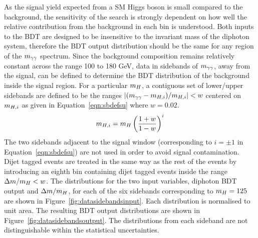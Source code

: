 As the signal yield expected from a SM Higgs boson is small compared to the background, 
the sensitivity of the search is strongly dependent on how well the relative contribution
from the background in each bin is understood.
Both inputs to the BDT are designed to be insensitive to the invariant mass of the diphoton system,
therefore the BDT output distribution should be the same for any region of the $m_{\gamma\gamma}$ spectrum.
Since the background composition remains relatively constant across the range 100 to 180 GeV, 
data in sidebands of $m_{\gamma\gamma}$, away from the signal, can be defined to determine the BDT  
distribution of the background inside the signal region. For a particular $m_{H}$, a contiguous
set of lower/upper sidebands are defined to be the ranges $|(m_{\gamma\gamma}-m_{H,i})/m_{H,i}| < w$ 
centered on $m_{H,i}$ as given in Equation~\ref{eqn:sbdefsu} where $w=0.02$.
\begin{eqnarray}
	m_{H,i} = m_{H} \left( \frac {\displaystyle 1+w }{1-w} \right)^{i} 
\label{eqn:sbdefsu}
\end{eqnarray}
The two sidebands adjacent to the signal window 
(corresponding to $i=\pm1$ in Equation~\ref{eqn:sbdefsu}) are not used in order
to avoid signal contamination. Dijet tagged events are treated in the same way as the rest of the events by introducing an eighth bin
containing dijet tagged events inside the range $\Delta m/m_{H} < w$.
The distributions for the two input variables, diphoton BDT output and $\Delta m/m_{H}$, 
for each of the six sidebands corresponding to $m_{H}=125$ are
shown in Figure~\ref{fig:datasidebandsinput}. Each distribution is normalised to unit area. The 
resulting BDT output distributions are shown in Figure~\ref{fig:datasidebandsoutput}. 
The distributions from each sideband are not distinguishable within the statistical 
uncertainties.

